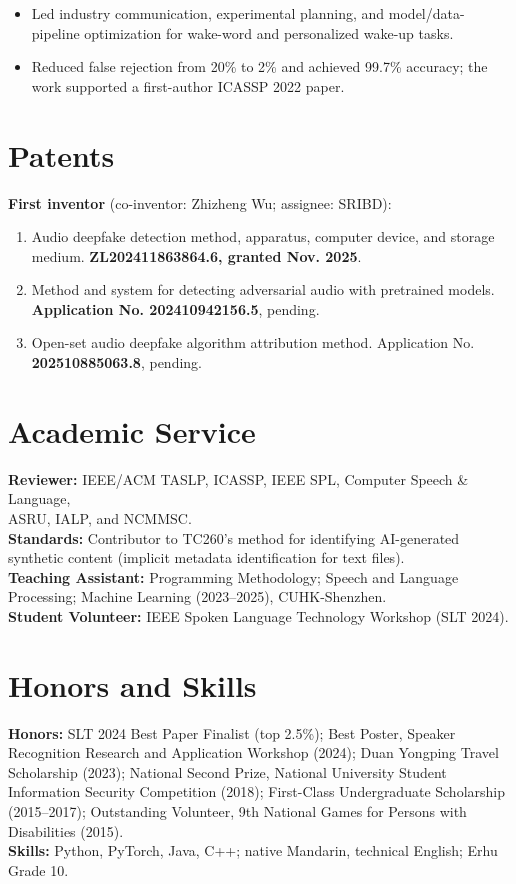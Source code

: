 \documentclass{resume}
\begin{document}
\begin{itemize}
  \item Led industry communication, experimental planning, and model/data-pipeline optimization for wake-word and personalized wake-up tasks.
  \item Reduced false rejection from 20\% to 2\% and achieved 99.7\% accuracy; the work supported a first-author ICASSP 2022 paper.
\end{itemize}

\section{Patents}
\textbf{First inventor} (co-inventor: Zhizheng Wu; assignee: SRIBD):
\begin{enumerate}
  \item Audio deepfake detection method, apparatus, computer device, and storage medium. \textbf{ZL202411863864.6, granted Nov. 2025}.
  \item Method and system for detecting adversarial audio with pretrained models.\\ \textbf{Application No. 202410942156.5}, pending.
  \item Open-set audio deepfake algorithm attribution method. Application No. \textbf{202510885063.8}, pending.
\end{enumerate}

\section{Academic Service}
\textbf{Reviewer:} IEEE/ACM TASLP, ICASSP, IEEE SPL, Computer Speech \& Language,\\ ASRU, IALP, and NCMMSC.\\
\textbf{Standards:} Contributor to TC260's method for identifying AI-generated synthetic content (implicit metadata identification for text files).\\
\textbf{Teaching Assistant:} Programming Methodology; Speech and Language Processing; Machine Learning (2023--2025), CUHK-Shenzhen.\\
\textbf{Student Volunteer:} IEEE Spoken Language Technology Workshop (SLT 2024).

\section{Honors and Skills}
\textbf{Honors:} SLT 2024 Best Paper Finalist (top 2.5\%); Best Poster, Speaker Recognition Research and Application Workshop (2024); Duan Yongping Travel Scholarship (2023); National Second Prize, National University Student Information Security Competition (2018); First-Class Undergraduate Scholarship (2015--2017); Outstanding Volunteer, 9th National Games for Persons with Disabilities (2015).\\
\textbf{Skills:} Python, PyTorch, Java, C++; native Mandarin, technical English; Erhu Grade 10.
\end{document}
